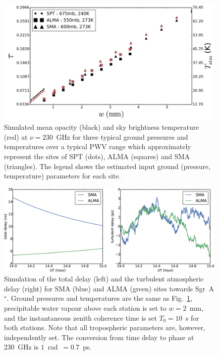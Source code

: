 {\begin{figure}
\begin{center}
\includegraphics[width=1.\columnwidth]{Images/opacity}
\caption{Simulated mean opacity (black) and sky brightness temperature (red) at $\nu =230$~GHz  for three typical ground pressures and temperatures over a typical PWV range \citep{Lane_1998} which approximately represent the sites of SPT (dots), ALMA (squares) and SMA (triangles). The legend shows the estimated input ground (pressure, temperature) parameters for each site.\label{fig:mean_atm}%
}
\end{center}
\end{figure}


\begin{figure}
\begin{center}
\includegraphics[width=\columnwidth]{Images/delays}
\caption{Simulation of the total delay (left) and the turbulent atmospheric delay (right) for SMA (blue) and ALMA (green) sites towards Sgr~A$^\star$. Ground pressures and temperatures are the same as Fig.~\ref{fig:mean_atm}, precipitable water vapour above each station is set to $w=2$~mm, and the instantaneous zenith coherence time is set $T_0=10$~s for both stations. Note that all tropospheric parameters are, however, independently set. The conversion from time delay to phase at 230~GHz is $1$~rad~$=0.7$~ps.\label{delay_plots}%
}
\end{center}
\end{figure}


}

